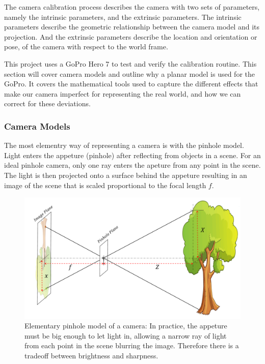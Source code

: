 \documentclass{UoNMCHA}
\numberwithin{equation}{section}
\begin{document}
The camera calibration process describes the camera with two sets of parameters, namely the intrinsic parameters, and the extrinsic parameters. The intrinsic parameters describe the geometric relationship between the camera model and its projection. And the extrinsic parameters describe the location and orientation or pose, of the camera with respect to the world frame.

This project uses a GoPro Hero 7 to test and verify the calibration routine. This section will cover camera models and outline why a planar model is used for the GoPro. It covers the mathematical tools used to capture the different effects that make our camera imperfect for representing the real world, and how we can correct for these deviations.
\subsubsection{Camera Models}
The most elementry way of representing a camera is with the pinhole model. Light enters the appeture (pinhole) after reflecting from objects in a scene. For an ideal pinhole camera, only one ray enters the apeture from any point in the scene. The light is then projected onto a surface behind the appeture resulting in an image of the scene that is scaled proportional to the focal length $f$.

\begin{figure}[ht]
    \begin{center}
        \includegraphics[width=.8\linewidth]{Figures/Pinhole_model}
        \caption{Elementary pinhole model of a camera: In practice, the appeture must be big enough to let light in, allowing a narrow ray of light from each point in the scene blurring the image. Therefore there is a tradeoff between brightness and sharpness.}
        \label{fig:PinholeModel}
    \end{center}
\end{figure}
\end{document}
